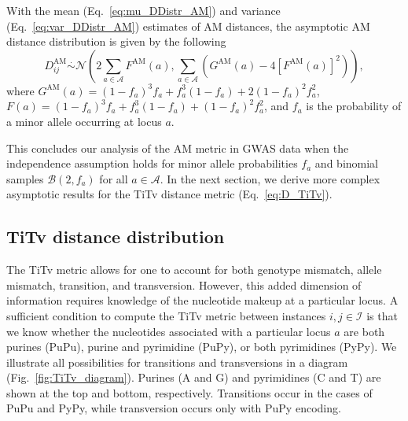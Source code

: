 \documentclass[aos]{imsart}
\begin{document}
With the mean (Eq.~\ref{eq:mu_DDistr_AM}) and variance (Eq.~\ref{eq:var_DDistr_AM}) estimates of AM distances, the asymptotic AM distance distribution is given by the following
%
\begin{equation}\label{eq:DDistr_AM}
D^\text{AM}_{ij} \overset{.}{\sim} \mathcal{N}\left(2\sum_{a \in \mathcal{A}} F^\text{AM}(a), \sum_{a \in \mathcal{A}} \left(G^\text{AM}(a)- 4\left[F^\text{AM}(a)\right]^2\right)\right),
\end{equation}
%
where $G^\text{AM}(a) = (1 - f_a)^3 f_a + f^3_a (1 - f_a) + 2 (1 - f_a)^2 f^2_a$, $F(a) = (1 - f_a)^3 f_a + f^3_a (1 - f_a) + (1 - f_a)^2 f^2_a$, and $f_a$ is the probability of a minor allele occurring at locus $a$.

This concludes our analysis of the AM metric in GWAS data when the independence assumption holds for minor allele probabilities $f_a$ and binomial samples $\mathcal{B}(2,f_a)$ for all $a \in \mathcal{A}$. In the next section, we derive more complex asymptotic results for the TiTv distance metric (Eq.~\ref{eq:D_TiTv}).

\subsection{TiTv distance distribution}\label{sec:TiTv_distances}

The TiTv metric allows for one to account for both genotype mismatch, allele mismatch, transition, and transversion. However, this added dimension of information requires knowledge of the nucleotide makeup at a particular locus. A sufficient condition to compute the TiTv metric between instances $i,j \in \mathcal{I}$ is that we know whether the nucleotides associated with a particular locus $a$ are both purines (PuPu), purine and pyrimidine (PuPy), or both pyrimidines (PyPy). We illustrate all possibilities for transitions and transversions in a diagram (Fig.~\ref{fig:TiTv_diagram}). Purines (A and G) and pyrimidines (C and T) are shown at the top and bottom, respectively. Transitions occur in the cases of PuPu and PyPy, while transversion occurs only with PuPy encoding.
\end{document}
